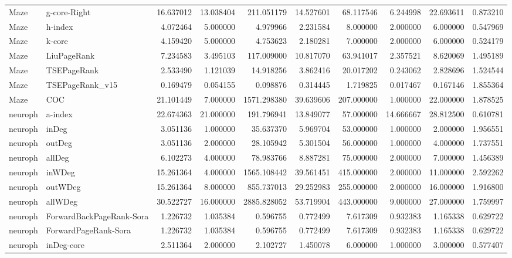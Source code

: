 \begin{tabular}{llrrrrrrrr}
Maze & g-core-Right & 16.637012 & 13.038404 & 211.051179 & 14.527601 & 68.117546 & 6.244998 & 22.693611 & 0.873210 \\
Maze & h-index & 4.072464 & 5.000000 & 4.979966 & 2.231584 & 8.000000 & 2.000000 & 6.000000 & 0.547969 \\
Maze & k-core & 4.159420 & 5.000000 & 4.753623 & 2.180281 & 7.000000 & 2.000000 & 6.000000 & 0.524179 \\
Maze & LiuPageRank & 7.234583 & 3.495103 & 117.009000 & 10.817070 & 63.941017 & 2.357521 & 8.620069 & 1.495189 \\
Maze & TSEPageRank & 2.533490 & 1.121039 & 14.918256 & 3.862416 & 20.017202 & 0.243062 & 2.828696 & 1.524544 \\
Maze & TSEPageRank_v15 & 0.169479 & 0.054155 & 0.098876 & 0.314445 & 1.719825 & 0.017467 & 0.167146 & 1.855364 \\
Maze & COC & 21.101449 & 7.000000 & 1571.298380 & 39.639606 & 207.000000 & 1.000000 & 22.000000 & 1.878525 \\
neuroph & a-index & 22.674363 & 21.000000 & 191.796941 & 13.849077 & 57.000000 & 14.666667 & 28.812500 & 0.610781 \\
neuroph & inDeg & 3.051136 & 1.000000 & 35.637370 & 5.969704 & 53.000000 & 1.000000 & 2.000000 & 1.956551 \\
neuroph & outDeg & 3.051136 & 2.000000 & 28.105942 & 5.301504 & 56.000000 & 1.000000 & 4.000000 & 1.737551 \\
neuroph & allDeg & 6.102273 & 4.000000 & 78.983766 & 8.887281 & 75.000000 & 2.000000 & 7.000000 & 1.456389 \\
neuroph & inWDeg & 15.261364 & 4.000000 & 1565.108442 & 39.561451 & 415.000000 & 2.000000 & 11.000000 & 2.592262 \\
neuroph & outWDeg & 15.261364 & 8.000000 & 855.737013 & 29.252983 & 255.000000 & 2.000000 & 16.000000 & 1.916800 \\
neuroph & allWDeg & 30.522727 & 16.000000 & 2885.828052 & 53.719904 & 443.000000 & 9.000000 & 27.000000 & 1.759997 \\
neuroph & ForwardBackPageRank-Sora & 1.226732 & 1.035384 & 0.596755 & 0.772499 & 7.617309 & 0.932383 & 1.165338 & 0.629722 \\
neuroph & ForwardPageRank-Sora & 1.226732 & 1.035384 & 0.596755 & 0.772499 & 7.617309 & 0.932383 & 1.165338 & 0.629722 \\
neuroph & inDeg-core & 2.511364 & 2.000000 & 2.102727 & 1.450078 & 6.000000 & 1.000000 & 3.000000 & 0.577407 \\

\end{tabular}
